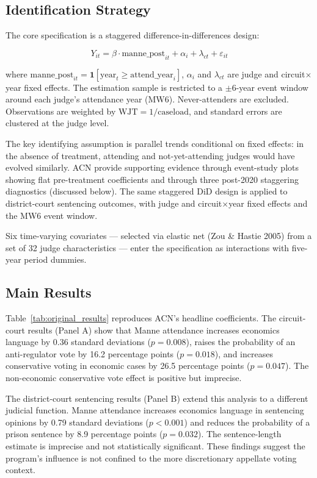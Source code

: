 \documentclass[12pt,a4paper]{article}
\begin{document}
\subsection{Identification Strategy}

The core specification is a staggered difference-in-differences design:

\begin{equation}
Y_{it} = \beta \cdot \text{manne\_post}_{it} + \alpha_i + \lambda_{ct} + \varepsilon_{it} \label{eq:twfe}
\end{equation}

where $\text{manne\_post}_{it} = \mathbf{1}[\text{year}_t \geq \text{attend\_year}_i]$, $\alpha_i$ and $\lambda_{ct}$ are judge and circuit$\times$year fixed effects. The estimation sample is restricted to a $\pm 6$-year event window around each judge's attendance year (MW6). Never-attenders are excluded. Observations are weighted by $\text{WJT} = 1/\text{caseload}$, and standard errors are clustered at the judge level.

The key identifying assumption is parallel trends conditional on fixed effects: in the absence of treatment, attending and not-yet-attending judges would have evolved similarly. ACN provide supporting evidence through event-study plots showing flat pre-treatment coefficients and through three post-2020 staggering diagnostics (discussed below). The same staggered DiD design is applied to district-court sentencing outcomes, with judge and circuit$\times$year fixed effects and the MW6 event window.

Six time-varying covariates --- selected via elastic net (Zou \& Hastie 2005) from a set of 32 judge characteristics --- enter the specification as interactions with five-year period dummies.

\subsection{Main Results}

Table~\ref{tab:original_results} reproduces ACN's headline coefficients. The circuit-court results (Panel A) show that Manne attendance increases economics language by 0.36 standard deviations ($p = 0.008$), raises the probability of an anti-regulator vote by 16.2 percentage points ($p = 0.018$), and increases conservative voting in economic cases by 26.5 percentage points ($p = 0.047$). The non-economic conservative vote effect is positive but imprecise.

The district-court sentencing results (Panel B) extend this analysis to a different judicial function. Manne attendance increases economics language in sentencing opinions by 0.79 standard deviations ($p < 0.001$) and reduces the probability of a prison sentence by 8.9 percentage points ($p = 0.032$). The sentence-length estimate is imprecise and not statistically significant. These findings suggest the program's influence is not confined to the more discretionary appellate voting context.
\end{document}
